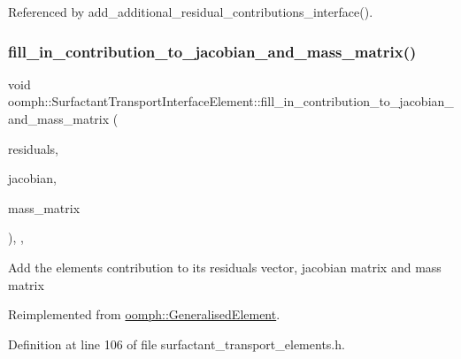 Referenced by add\+\_\+additional\+\_\+residual\+\_\+contributions\+\_\+interface().

\mbox{\label{classoomph_1_1SurfactantTransportInterfaceElement_a7c0f9b63cea887a4a65abbe9aeb3b3cf}} 
\subsubsection{\texorpdfstring{fill\+\_\+in\+\_\+contribution\+\_\+to\+\_\+jacobian\+\_\+and\+\_\+mass\+\_\+matrix()}{fill\_in\_contribution\_to\_jacobian\_and\_mass\_matrix()}}
{\footnotesize\ttfamily void oomph\+::\+Surfactant\+Transport\+Interface\+Element\+::fill\+\_\+in\+\_\+contribution\+\_\+to\+\_\+jacobian\+\_\+and\+\_\+mass\+\_\+matrix (\begin{DoxyParamCaption}\item[{\hyperlink{classoomph_1_1Vector}{Vector}$<$ double $>$ \&}]{residuals,  }\item[{\hyperlink{classoomph_1_1DenseMatrix}{Dense\+Matrix}$<$ double $>$ \&}]{jacobian,  }\item[{\hyperlink{classoomph_1_1DenseMatrix}{Dense\+Matrix}$<$ double $>$ \&}]{mass\+\_\+matrix }\end{DoxyParamCaption})\hspace{0.3cm}{\ttfamily [inline]}, {\ttfamily [protected]}, {\ttfamily [virtual]}}

Add the element\textquotesingle{}s contribution to its residuals vector, jacobian matrix and mass matrix 

Reimplemented from \hyperlink{classoomph_1_1GeneralisedElement_a2b6294a730647cf865da94f2531466f8}{oomph\+::\+Generalised\+Element}.



Definition at line 106 of file surfactant\+\_\+transport\+\_\+elements.\+h.



